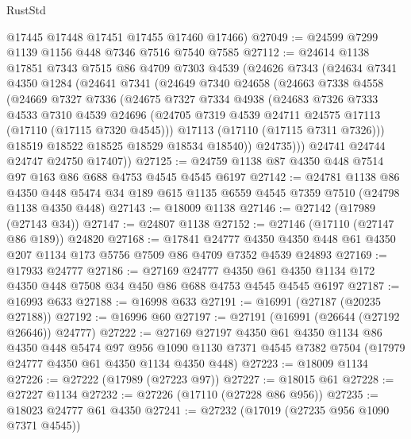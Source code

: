 \begin{lexlean}{RustStd}
\begin{coremodule}
      @17445
      @17448
      @17451
      @17455
      @17460
      @17466)
@27049 := @24599 @7299 @1139 @1156 @448 @7346 @7516 @7540 @7585
@27112 := @24614
    @1138
    @17851
    @7343
    @7515
    @86
    @4709
    @7303
    @4539
    (@24626
      @7343
      (@24634
        @7341
        @4350
        @1284
        (@24641
          @7341
          (@24649
            @7340
            @24658
            (@24663
              @7338
              @4558
              (@24669
                @7327
                @7336
                (@24675
                  @7327
                  @7334
                  @4938
                  (@24683
                    @7326
                    @7333
                    @4533
                    @7310
                    @4539
                    @24696
                    (@24705 @7319 @4539 @24711 @24575 @17113 (@17110 (@17115 @7320 @4545)))
                    @17113
                    (@17110 (@17115 @7311 @7326)))
                  @18519
                  @18522
                  @18525
                  @18529
                  @18534
                  @18540))
              @24735)))
        @24741
        @24744
        @24747
        @24750
        @17407))
@27125 := @24759 @1138 @87 @4350 @448 @7514 @97 @163 @86 @688 @4753 @4545 @4545 @6197
@27142 := @24781
    @1138
    @86
    @4350
    @448
    @5474
    @34
    @189
    @615
    @1135
    @6559
    @4545
    @7359
    @7510
    (@24798 @1138 @4350 @448)
@27143 := @18009 @1138
@27146 := @27142 (@17989 (@27143 @34))
@27147 := @24807 @1138
@27152 := @27146 (@17110 (@27147 @86 @189)) @24820
@27168 := @17841
    @24777
    @4350
    @4350
    @448
    @61
    @4350
    @207
    @1134
    @173
    @5756
    @7509
    @86
    @4709
    @7352
    @4539
    @24893
@27169 := @17933 @24777
@27186 := @27169
    @24777
    @4350
    @61
    @4350
    @1134
    @172
    @4350
    @448
    @7508
    @34
    @450
    @86
    @688
    @4753
    @4545
    @4545
    @6197
@27187 := @16993 @633
@27188 := @16998 @633
@27191 := @16991 (@27187 (@20235 @27188))
@27192 := @16996 @60
@27197 := @27191 (@16991 (@26644 (@27192 @26646)) @24777)
@27222 := @27169
    @27197
    @4350
    @61
    @4350
    @1134
    @86
    @4350
    @448
    @5474
    @97
    @956
    @1090
    @1130
    @7371
    @4545
    @7382
    @7504
    (@17979 @24777 @4350 @61 @4350 @1134 @4350 @448)
@27223 := @18009 @1134
@27226 := @27222 (@17989 (@27223 @97))
@27227 := @18015 @61
@27228 := @27227 @1134
@27232 := @27226 (@17110 (@27228 @86 @956))
@27235 := @18023 @24777 @61 @4350
@27241 := @27232 (@17019 (@27235 @956 @1090 @7371 @4545))

\end{coremodule}
\end{lexlean}
